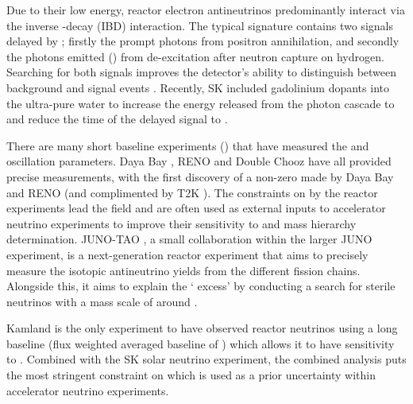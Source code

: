Due to their low energy, reactor electron antineutrinos predominantly interact via the inverse \quickmath{\beta}-decay (IBD) interaction. The typical signature contains two signals delayed by ; firstly the prompt photons from positron annihilation, and secondly the photons emitted () from de-excitation after neutron capture on hydrogen. Searching for both signals improves the detector's ability to distinguish between background and signal events \cite{Abe2022-ij}. Recently, SK included gadolinium dopants into the ultra-pure water to increase the energy released from the photon cascade to  and reduce the time of the delayed signal to .

There are many short baseline experiments () that have measured the \sinsqreac and \delmsqatm oscillation parameters. Daya Bay \cite{PhysRevLett.108.171803}, RENO \cite{PhysRevLett.108.191802} and Double Chooz \cite{PhysRevLett.108.131801} have all provided precise measurements, with the first discovery of a non-zero  made by Daya Bay and RENO (and complimented by T2K \cite{PhysRevLett.108.131801}). The constraints on \sinsqreac by the reactor experiments lead the field and are often used as external inputs to accelerator neutrino experiments to improve their sensitivity to \dcp and mass hierarchy determination.
JUNO-TAO \cite{junocollaboration2020tao}, a small collaboration within the larger JUNO experiment, is a next-generation reactor experiment that aims to precisely measure the isotopic antineutrino yields from the different fission chains. Alongside this, it aims to explain the ` excess' \cite{For_the_RENO_Collaboration2015-zy, Abe_2014, PhysRevLett.123.111801} by conducting a search for sterile neutrinos with a mass scale of around .

Kamland \cite{Decowski2016-hh} is the only experiment to have observed reactor neutrinos using a long baseline (flux weighted averaged baseline of ) which allows it to have sensitivity to \delmsqsol. Combined with the SK solar neutrino experiment, the combined analysis puts the most stringent constraint on \delmsqsol \cite{PhysRevD.83.052002} which is used as a prior uncertainty within accelerator neutrino experiments.

